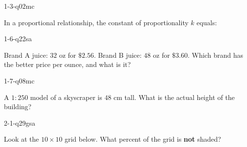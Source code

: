 
\begin{practiceQuestion}{1-3-q02}{mc}
\begin{questionText}
In a proportional relationship, the constant of proportionality $k$ equals:
\end{questionText}
\end{practiceQuestion}

\begin{practiceQuestion}{1-6-q22}{sa}
\begin{questionText}
Brand A juice: $32$ oz for $\$2.56$. Brand B juice: $48$ oz for $\$3.60$. Which brand has the better price per ounce, and what is it?
\end{questionText}
\end{practiceQuestion}

\begin{practiceQuestion}{1-7-q08}{mc}
\begin{questionText}
A $1 : 250$ model of a skyscraper is $48$ cm tall. What is the actual height of the building?
\end{questionText}
\end{practiceQuestion}

\begin{practiceQuestion}{2-1-q29}{gsa}
\begin{questionText}
Look at the $10 \times 10$ grid below. What percent of the grid is \textbf{not} shaded?

\begin{center}
\end{center}
\end{questionText}
\end{practiceQuestion}

